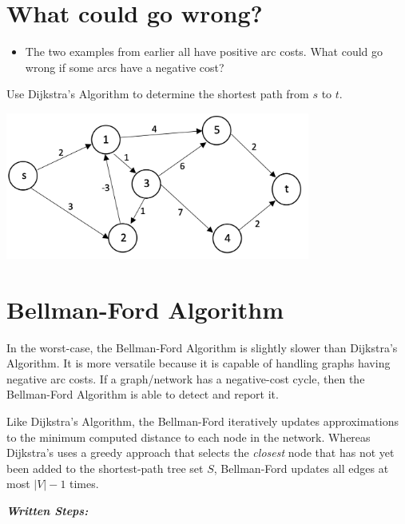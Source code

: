 \documentclass[12pt]{article}
\theoremstyle{definition}
\begin{document}
\vfill

\newpage

\section{What could go wrong?}

\begin{itemize}

\item The two examples from earlier all have positive arc costs. What could go wrong if some arcs have a negative cost?

\end{itemize}
\vfill
 
Use Dijkstra's Algorithm to determine the shortest path from $s$ to $t$.

\begin{center}
\includegraphics[width=10cm]{shortestpathnegativecycles}
\end{center}

\vfill


\newpage
\section{Bellman-Ford Algorithm}


In the worst-case, the Bellman-Ford Algorithm is slightly slower than Dijkstra's Algorithm. It is more versatile because it is capable of handling graphs having negative arc costs. If a graph/network has a negative-cost cycle, then the Bellman-Ford Algorithm is able to detect and report it.

Like Dijkstra's Algorithm, the Bellman-Ford iteratively updates approximations to the minimum computed distance to each node in the network. Whereas Dijkstra's uses a greedy approach that selects the \emph{closest} node that has not yet been added to the shortest-path tree set $S$, Bellman-Ford updates all edges at most $|V| - 1$ times. 

\emph{\textbf{Written Steps:}}
\end{document}
